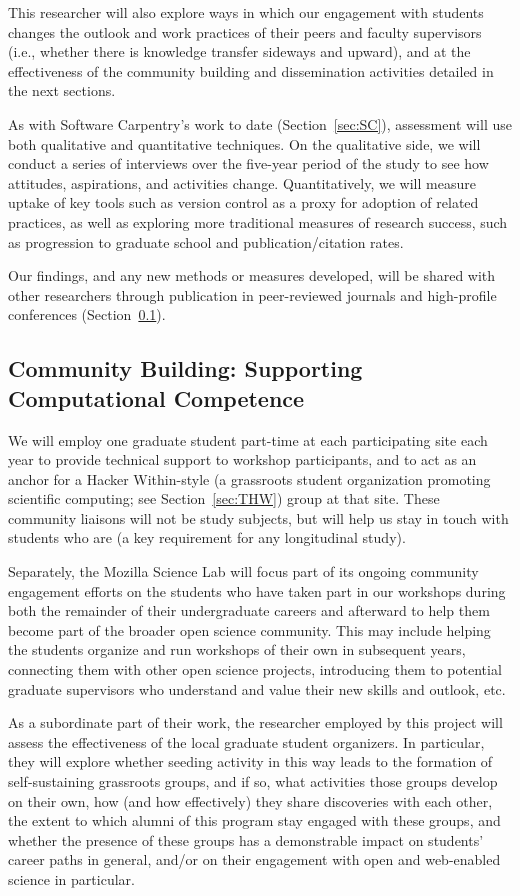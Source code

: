 \documentclass{proposalnsf}
\newlength{\up}
\begin{document}
This researcher will also explore ways in which our engagement with
students changes the outlook and work practices of their peers and
faculty supervisors (i.e., whether there is knowledge transfer
sideways and upward), and at the effectiveness of the community
building and dissemination activities detailed in the next sections.

As with Software Carpentry's work to date (Section~\ref{sec:SC}),
assessment will use both qualitative and quantitative techniques.  On
the qualitative side, we will conduct a series of interviews over the
five-year period of the study to see how attitudes, aspirations, and
activities change.  Quantitatively, we will measure uptake of key
tools such as version control as a proxy for adoption of related
practices, as well as exploring more traditional measures of research
success, such as progression to graduate school and
publication/citation rates.

Our findings, and any new methods or measures developed, will be
shared with other researchers through publication in peer-reviewed
journals and high-profile conferences (Section~\ref{sec:pub}).

\subsection{Community Building: Supporting Computational Competence}
\label{sec:pub}

We will employ one graduate student part-time at each participating
site each year to provide technical support to workshop participants,
and to act as an anchor for a Hacker Within-style
(a grassroots student organization promoting scientific computing; see Section~\ref{sec:THW}) group at that site.  These
community liaisons will not be study subjects, but will help us stay
in touch with students who are (a key requirement for any longitudinal
study).

Separately, the Mozilla Science Lab will focus part of its ongoing
community engagement efforts on the students who have taken part in
our workshops during both the remainder of their undergraduate careers
and afterward to help them become part of the broader
open science community.  This may include helping the students
organize and run workshops of their own in subsequent years,
connecting them with other open science projects, introducing them to
potential graduate supervisors who understand and value their new
skills and outlook, etc.

As a subordinate part of their work, the researcher employed by this
project will assess the effectiveness of the local graduate student organizers.  In
particular, they will explore whether seeding activity in this way
leads to the formation of self-sustaining grassroots groups, and if
so, what activities those groups develop on their own, how (and how
effectively) they share discoveries with each other, the extent to
which alumni of this program stay engaged with these groups, and
whether the presence of these groups has a demonstrable impact on
students' career paths in general, and/or on their engagement with open and
web-enabled science in particular.
\end{document}

